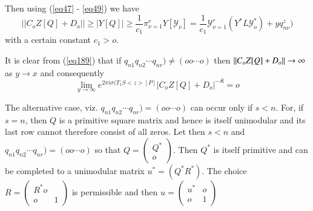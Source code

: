 Then using (\ref{eq47} - \ref{eq49}) we have
\begin{equation*}
|| C_o Z [Q] + D_o || \ge | Y [Q] | \ge \frac{1}{c_1} \pi^r_{\nu = 1}
Y [\mathscr{Y}_\nu] = \frac{1}{c_1} \mathscr{Y}^r_{\nu = 1} (Y^* L
\mathscr{Y}_o^*) +y q^{z}_{n \nu}) \tag{189}\label{eq189}  
\end{equation*}
with a certain constant $c_1 > o$.


It is clear from (\ref{eq189}) that if $q_{n1} q_{n2} \cdots q_{n r}) \neq
(o o \cdots o)$ then $|| C_o Z\break [Q] + D_o || \to \infty$ as $y \to x$
and consequently 
$$
\lim_{y \to \infty} e^{2 \pi i \sigma (T_1 S <z> [P]} | C_o Z [Q] +
D_o |^{-\mathfrak{K}}= o 
$$

The alternative case, viz. $q_{n1} q_{n2} \cdots q_{n r}) = ( o o
\cdots o)$ can occur only if $ s < n$. For, if $s = n$, then $Q$ is a
primitive square matrix and hence is itself unimodular and its last
row cannot therefore consist of all zeros. Let then $s < n$ and
$q_{n1} q_{n2} \cdots q_{n r}) = ( o o \cdots o)$ so that $Q
= \begin{pmatrix} Q^*  \\ o   \end{pmatrix}$. Then $Q^*$ is itself
primitive and can be completed to a unimodular matrix $u^* = (Q ^*
R^*)$. The choice $R = \begin{pmatrix} R^* o \\ o & 1 \end{pmatrix} $
is permissible and then $u = \begin{pmatrix} u^* & o \\ o &
  1 \end{pmatrix}$ 

